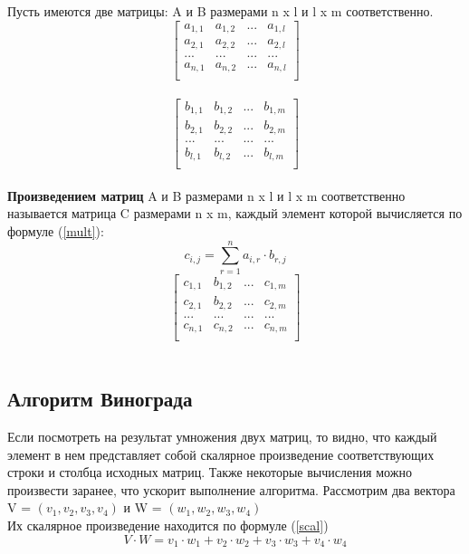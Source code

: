 \documentclass[a4paper, 14pt]{article}
\begin{document}
		Пусть имеются две матрицы: A и B размерами n x l и l x m соответственно.\\
		\[ \begin{bmatrix}
		a_{1,1} & a_{1,2} & ... & a_{1,l} \\
		a_{2,1} & a_{2,2} & ... & a_{2,l}\\		
		... & ... & ... & ... \\
		a_{n,1} & a_{n, 2} & ... & a_{n,l} \\
		\end{bmatrix} \]\\
				\[ \begin{bmatrix}
		b_{1,1} & b_{1,2} & ... & b_{1,m} \\
		b_{2,1} & b_{2,2} & ... & b_{2,m}\\		
		... & ... & ... & ... \\
		b_{l,1} & b_{l, 2} & ... & b_{l,m} \\
		\end{bmatrix} \]\\
		
		
		\textbf{Произведением матриц} A и B размерами n x l и l x m соответственно называется матрица C размерами n x m, каждый элемент которой вычисляется по формуле (\ref{mult}):\\
		\begin{equation} \label{mult}
		c_{i,j} = \sum\limits_{r=1}^n a_{i,r}\cdot b_{r,j}
		\end{equation}		
		\[ \begin{bmatrix}
		c_{1,1} & b_{1,2} & ... & c_{1,m} \\
		c_{2,1} & b_{2,2} & ... & c_{2,m}\\		
		... & ... & ... & ... \\
		c_{n,1} & c_{n, 2} & ... & c_{n,m} \\
		\end{bmatrix} \]\\
		
		\subsection{Алгоритм Винограда}
		
		Если посмотреть на результат умножения двух матриц, то видно,
		что каждый элемент в нем представляет собой скалярное произведение
		соответствующих строки и столбца исходных матриц. Также некоторые вычисления можно произвести заранее, что ускорит выполнение алгоритма.
		Рассмотрим два вектора V = $(v_{1}, v_{2}, v_{3}, v_{4})$ и W = $(w_{1}, w_{2}, w_{3}, w_{4})$\\
		    Их скалярное произведение находится по формуле (\ref{scal})\\
		    \begin{equation}\label{scal}
 V \cdot W=v_1 \cdot w_1 + v_2 \cdot w_2 + v_3 \cdot w_3 + v_4 \cdot w_4 
		    \end{equation}
		    
\end{document}
